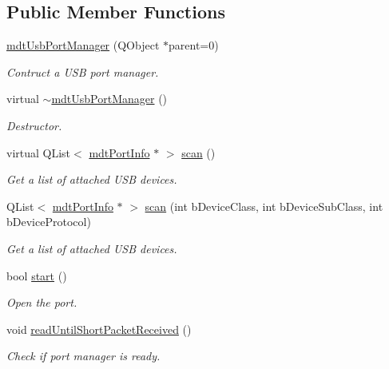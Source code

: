 \subsection*{Public Member Functions}
\begin{DoxyCompactItemize}
\item 
\hyperlink{classmdt_usb_port_manager_a7f82574e84d0a99d1c8bef7fd79283e3}{mdtUsbPortManager} (QObject $\ast$parent=0)
\begin{DoxyCompactList}\small\item\em Contruct a USB port manager. \end{DoxyCompactList}\item 
virtual \hyperlink{classmdt_usb_port_manager_ac0da1cf62e664b78fe91b873da5835ce}{$\sim$mdtUsbPortManager} ()
\begin{DoxyCompactList}\small\item\em Destructor. \end{DoxyCompactList}\item 
virtual QList$<$ \hyperlink{classmdt_port_info}{mdtPortInfo} $\ast$ $>$ \hyperlink{classmdt_usb_port_manager_a3a2370c3a2d0353a880bf9b777728c3b}{scan} ()
\begin{DoxyCompactList}\small\item\em Get a list of attached USB devices. \end{DoxyCompactList}\item 
QList$<$ \hyperlink{classmdt_port_info}{mdtPortInfo} $\ast$ $>$ \hyperlink{classmdt_usb_port_manager_ab28253c46c80bb12cbbd116b05c4bcd3}{scan} (int bDeviceClass, int bDeviceSubClass, int bDeviceProtocol)
\begin{DoxyCompactList}\small\item\em Get a list of attached USB devices. \end{DoxyCompactList}\item 
bool \hyperlink{classmdt_usb_port_manager_ac656805c6de08c9c6a2487291cf3f347}{start} ()
\begin{DoxyCompactList}\small\item\em Open the port. \end{DoxyCompactList}\item 
void \hyperlink{classmdt_usb_port_manager_adff8a1f8ed2b0e68229e2016c75e04a6}{readUntilShortPacketReceived} ()
\begin{DoxyCompactList}\small\item\em Check if port manager is ready. \end{DoxyCompactList}\item 

\end{DoxyCompactItemize}
